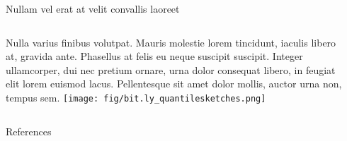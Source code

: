 \documentclass[final]{beamer}
\newlength{\sepwidth}
\newlength{\colwidth}
\newcommand{\separatorcolumn}{\begin{column}{\sepwidth}\end{column}}
\begin{document}
\begin{frame}[t]
\begin{columns}[t]
\begin{column}{\colwidth}
\begin{alertblock}{Nullam vel erat at velit convallis laoreet}
    \vspace{5mm}
    \begin{columns}
        Nulla varius finibus volutpat. Mauris molestie lorem tincidunt, iaculis
        libero at, gravida ante. Phasellus at felis eu neque suscipit suscipit.
        Integer ullamcorper, dui nec pretium ornare, urna dolor consequat libero,
        in feugiat elit lorem euismod lacus. Pellentesque sit amet dolor mollis,
        auctor urna non, tempus sem.
        \centering
        \texttt{[image: fig/bit.ly\_quantilesketches.png]}
    \end{columns}
    
  \end{alertblock}

  \begin{block}{References}

    \nocite{*}
    {}

  \end{block}

\end{column}

\separatorcolumn
\end{columns}
\end{frame}
\end{document}
